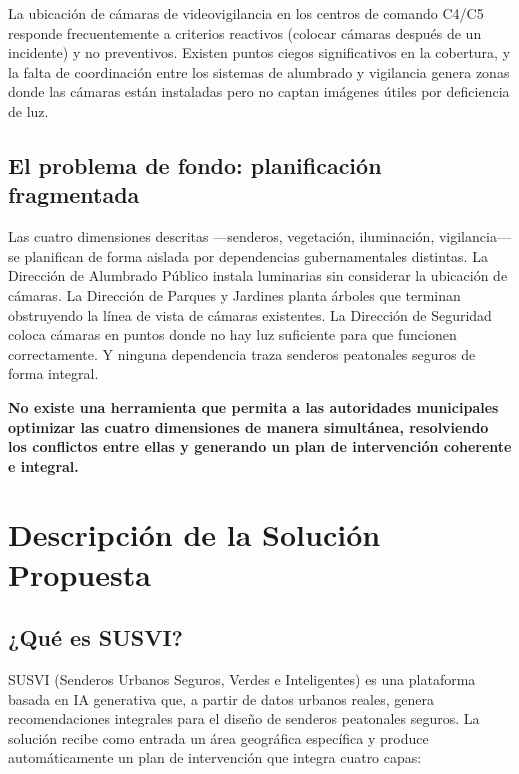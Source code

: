 \documentclass[12pt,a4paper]{article}
\begin{document}
La ubicación de cámaras de videovigilancia en los centros de comando C4/C5 responde frecuentemente a criterios reactivos (colocar cámaras después de un incidente) y no preventivos. Existen puntos ciegos significativos en la cobertura, y la falta de coordinación entre los sistemas de alumbrado y vigilancia genera zonas donde las cámaras están instaladas pero no captan imágenes útiles por deficiencia de luz.

\subsection{El problema de fondo: planificación fragmentada}

Las cuatro dimensiones descritas —senderos, vegetación, iluminación, vigilancia— se planifican de forma aislada por dependencias gubernamentales distintas. La Dirección de Alumbrado Público instala luminarias sin considerar la ubicación de cámaras. La Dirección de Parques y Jardines planta árboles que terminan obstruyendo la línea de vista de cámaras existentes. La Dirección de Seguridad coloca cámaras en puntos donde no hay luz suficiente para que funcionen correctamente. Y ninguna dependencia traza senderos peatonales seguros de forma integral.

\textbf{No existe una herramienta que permita a las autoridades municipales optimizar las cuatro dimensiones de manera simultánea, resolviendo los conflictos entre ellas y generando un plan de intervención coherente e integral.}


\section{Descripción de la Solución Propuesta}

\subsection{¿Qué es SUSVI?}

SUSVI (Senderos Urbanos Seguros, Verdes e Inteligentes) es una plataforma basada en IA generativa que, a partir de datos urbanos reales, genera recomendaciones integrales para el diseño de senderos peatonales seguros. La solución recibe como entrada un área geográfica específica y produce automáticamente un plan de intervención que integra cuatro capas:
\end{document}
